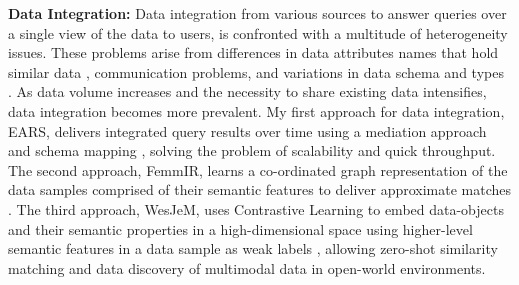 \textbf{Data Integration:} 
Data integration from various sources to answer queries over a single view of the data to users, is confronted with a multitude of heterogeneity issues. These problems arise from differences in data attributes names that hold similar data \cite{solaiman2021applying, solaiman2022femmir}, communication problems, and variations in data schema and types \cite{solaiman2022open}. As data volume increases and the necessity to share existing data intensifies, data integration becomes more prevalent.
%
My first approach for data integration, EARS, delivers integrated query results over time using a mediation approach and schema mapping \cite{solaiman2021applying}, solving the problem of scalability and quick throughput. The second approach, FemmIR, learns a co-ordinated graph representation of the data samples comprised of their semantic features to deliver approximate matches \cite{solaiman2022femmir}. 
The third approach, WesJeM, uses Contrastive Learning to embed data-objects and their semantic properties in a high-dimensional space using higher-level semantic features in a data sample as weak labels \cite{solaiman2022open}, allowing zero-shot similarity matching and data discovery of multimodal data in open-world environments.